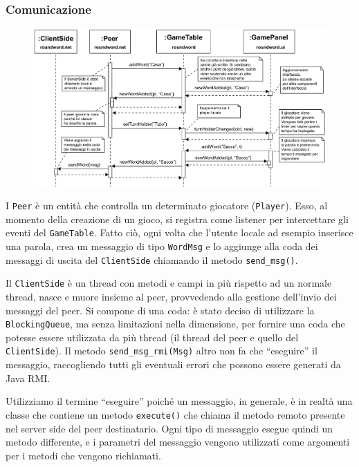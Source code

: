 \documentclass[10.5pt]{article}
\begin{document}
\subsubsection{Comunicazione}

\begin{figure}
	\begin{center}
		\hspace*{-0.2in}
		\includegraphics[scale=0.55]{imgs/Sequence1.pdf}
		\label{fig:sequence1}
		\caption{}
	\end{center}
\end{figure}	


I \texttt{Peer} è un entità che controlla un determinato giocatore (\texttt{Player}). Esso, al momento della creazione di un gioco, si registra come listener per intercettare gli eventi del \texttt{GameTable}. Fatto ciò, ogni volta che l'utente locale ad esempio inserisce una parola, crea un messaggio di tipo \texttt{WordMsg} e lo aggiunge alla coda dei messaggi di uscita del \texttt{ClientSide} chiamando il metodo \texttt{send\_msg()}.

Il \texttt{ClientSide} è un thread con metodi e campi in più rispetto ad un normale thread, nasce e muore insieme al peer, provvedendo alla gestione dell'invio dei messaggi del peer. Si compone di una coda: è stato deciso di utilizzare la \texttt{BlockingQueue}, ma senza limitazioni nella dimensione, per fornire una coda che potesse essere utilizzata da più thread (il thread del peer e quello del \texttt{ClientSide}). Il metodo \texttt{send\_msg\_rmi(Msg)} altro non fa che ``eseguire'' il messaggio, raccogliendo tutti gli eventuali errori che possono essere generati da Java RMI. 

Utilizziamo il termine ``eseguire'' poiché un messaggio, in generale, è in realtà una classe che contiene un metodo \texttt{execute()} che chiama il metodo remoto presente nel server side del peer destinatario. Ogni tipo di messaggio esegue quindi un metodo differente, e i parametri del messaggio vengono utilizzati come argomenti per i metodi che vengono richiamati. 
\end{document}
